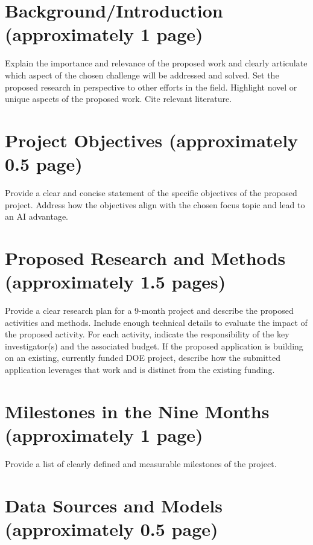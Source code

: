\documentclass[pgs]{DOE}
\begin{document}
\section{Background/Introduction (approximately 1 page)}

Explain the importance and relevance of the proposed work and clearly articulate which aspect of the chosen challenge will be addressed and solved. Set the proposed research in perspective to other efforts in the field. Highlight novel or unique aspects of the proposed work. Cite relevant literature.

\vspace{18pt}
\section{Project Objectives (approximately 0.5 page)}

Provide a clear and concise statement of the specific objectives of the proposed project. Address how the objectives align with the chosen focus topic and lead to an AI advantage.  

\vspace{18pt}
\section{Proposed Research and Methods (approximately 1.5 pages)}

Provide a clear research plan for a 9-month project and describe the proposed activities and methods. Include enough technical details to evaluate the impact of the proposed activity. For each activity, indicate the responsibility of the key investigator(s) and the associated budget. If the proposed application is building on an existing, currently funded DOE project, describe how the submitted application leverages that work and is distinct from the existing funding.

\vspace{18pt}
\section{Milestones in the Nine Months (approximately 1 page)}

Provide a list of clearly defined and measurable milestones of the project.  

\vspace{18pt}
\section{Data Sources and Models (approximately 0.5 page)}
\end{document}
